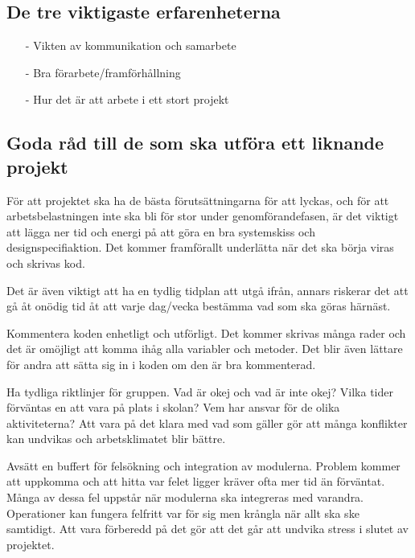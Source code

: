 \documentclass[11pt]{article}
\begin{document}
\subsection{De tre viktigaste erfarenheterna}
\begin{itemize}
  \item[-] Vikten av kommunikation och samarbete
  \item[-] Bra förarbete/framförhållning
  \item[-] Hur det är att arbete i ett stort projekt
\end{itemize} 

\subsection{Goda råd till de som ska utföra ett liknande projekt}
För att projektet ska ha de bästa förutsättningarna för att lyckas, och för att arbetsbelastningen inte ska bli för stor under genomförandefasen, är det viktigt att lägga ner tid och energi på att göra en bra systemskiss och designspecifiaktion. Det kommer framförallt underlätta när det ska börja viras och skrivas kod. 

Det är även viktigt att ha en tydlig tidplan att utgå ifrån, annars riskerar det att gå åt onödig tid åt att varje dag/vecka bestämma vad som ska göras härnäst.

Kommentera koden enhetligt och utförligt. Det kommer skrivas många rader och det är omöjligt att komma ihåg alla variabler och metoder. Det blir även lättare för andra att sätta sig in i koden om den är bra kommenterad. 

Ha tydliga riktlinjer för gruppen. Vad är okej och vad är inte okej? Vilka tider förväntas en att vara på plats i skolan? Vem har ansvar för de olika aktiviteterna? Att vara på det klara med vad som gäller gör att många konflikter kan undvikas och arbetsklimatet blir bättre.

Avsätt en buffert för felsökning och integration av modulerna. Problem kommer att uppkomma och att hitta var felet ligger kräver ofta mer tid än förväntat. Många av dessa fel uppstår när modulerna ska integreras med varandra. Operationer kan fungera felfritt var för sig men krångla när allt ska ske samtidigt. Att vara förberedd på det gör att det går att undvika stress i slutet av projektet. 
\end{document}
